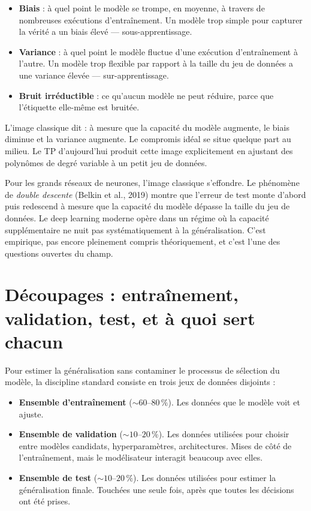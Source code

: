 \begin{itemize}
  \item \textbf{Biais} : à quel point le modèle se trompe, en moyenne, à travers de nombreuses exécutions d'entraînement. Un modèle trop simple pour capturer la vérité a un biais élevé --- sous-apprentissage.
  \item \textbf{Variance} : à quel point le modèle fluctue d'une exécution d'entraînement à l'autre. Un modèle trop flexible par rapport à la taille du jeu de données a une variance élevée --- sur-apprentissage.
  \item \textbf{Bruit irréductible} : ce qu'aucun modèle ne peut réduire, parce que l'étiquette elle-même est bruitée.
\end{itemize}

L'image classique dit : à mesure que la capacité du modèle augmente, le biais diminue et la variance augmente. Le compromis idéal se situe quelque part au milieu. Le TP d'aujourd'hui produit cette image explicitement en ajustant des polynômes de degré variable à un petit jeu de données.

\begin{aitip}
Pour les grands réseaux de neurones, l'image classique s'effondre. Le phénomène de \emph{double descente} (Belkin et al., 2019) montre que l'erreur de test monte d'abord puis redescend à mesure que la capacité du modèle dépasse la taille du jeu de données. Le deep learning moderne opère dans un régime où la capacité supplémentaire ne nuit pas systématiquement à la généralisation. C'est empirique, pas encore pleinement compris théoriquement, et c'est l'une des questions ouvertes du champ.
\end{aitip}

\section{Découpages : entraînement, validation, test, et à quoi sert chacun}

Pour estimer la généralisation sans contaminer le processus de sélection du modèle, la discipline standard consiste en trois jeux de données disjoints :

\begin{itemize}
  \item \textbf{Ensemble d'entraînement} ($\sim 60$--$80\,\%$). Les données que le modèle voit et ajuste.
  \item \textbf{Ensemble de validation} ($\sim 10$--$20\,\%$). Les données utilisées pour choisir entre modèles candidats, hyperparamètres, architectures. Mises de côté de l'entraînement, mais le modélisateur interagit beaucoup avec elles.
  \item \textbf{Ensemble de test} ($\sim 10$--$20\,\%$). Les données utilisées pour estimer la généralisation finale. Touchées une seule fois, après que toutes les décisions ont été prises.
\end{itemize}

